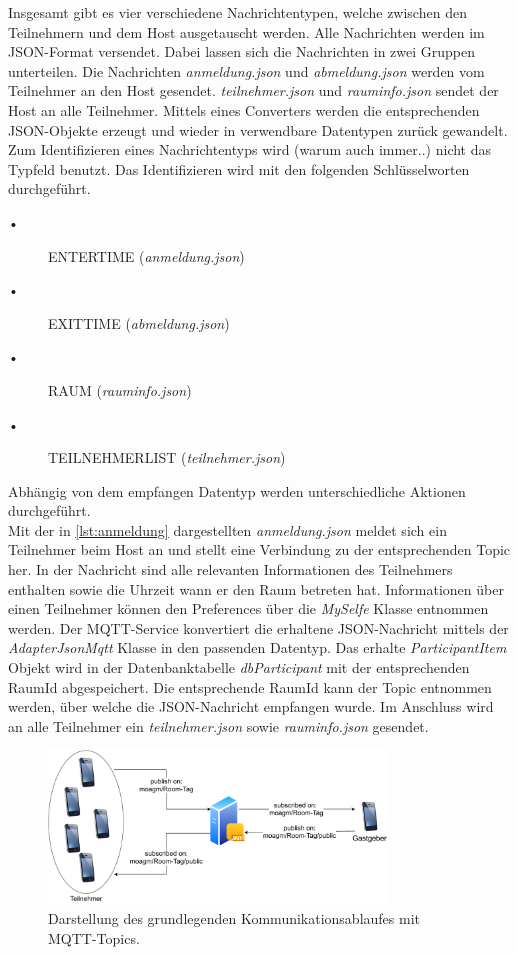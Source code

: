 Insgesamt gibt es vier verschiedene Nachrichtentypen, welche zwischen den Teilnehmern und dem Host ausgetauscht werden. Alle Nachrichten werden im JSON-Format versendet. Dabei lassen sich die Nachrichten in zwei Gruppen unterteilen. Die Nachrichten \textit{anmeldung.json} und \textit{abmeldung.json} werden vom Teilnehmer an den Host gesendet. \textit{teilnehmer.json} und \textit{rauminfo.json} sendet der Host an alle Teilnehmer. Mittels eines Converters werden die entsprechenden JSON-Objekte erzeugt und wieder in verwendbare Datentypen zurück gewandelt. Zum Identifizieren eines Nachrichtentyps wird (warum auch immer..) nicht das Typfeld benutzt. 
Das Identifizieren wird mit den folgenden Schlüsselworten durchgeführt.
\begin{description}
\item[•] ENTERTIME (\textit{anmeldung.json})
\item[•] EXITTIME (\textit{abmeldung.json})
\item[•] RAUM (\textit{rauminfo.json})
\item[•] TEILNEHMERLIST (\textit{teilnehmer.json})
\end{description}
Abhängig von dem empfangen Datentyp werden unterschiedliche Aktionen durchgeführt.
\\
Mit der in \cref{lst:anmeldung} dargestellten \textit{anmeldung.json} meldet sich ein Teilnehmer beim Host an und stellt eine Verbindung zu der entsprechenden Topic her. In der Nachricht sind alle relevanten Informationen des Teilnehmers enthalten sowie die Uhrzeit wann er den Raum betreten hat. Informationen über einen Teilnehmer können den Preferences über die \textit{MySelfe} Klasse entnommen werden. Der MQTT-Service konvertiert die erhaltene JSON-Nachricht mittels der \textit{AdapterJsonMqtt} Klasse in den passenden Datentyp. Das erhalte \textit{ParticipantItem} Objekt wird in der Datenbanktabelle \textit{dbParticipant} mit der  entsprechenden RaumId abgespeichert. Die entsprechende RaumId kann der Topic entnommen werden, über welche die JSON-Nachricht empfangen wurde. Im Anschluss wird an alle Teilnehmer ein \textit{teilnehmer.json} sowie \textit{rauminfo.json} gesendet.
\begin{figure}
	\centering
	\includegraphics[width =0.8\textwidth]{images/mqttservice.pdf}
	\caption{Darstellung des grundlegenden Kommunikationsablaufes mit MQTT-Topics.}
	\label{img:mqtt}
\end{figure}
